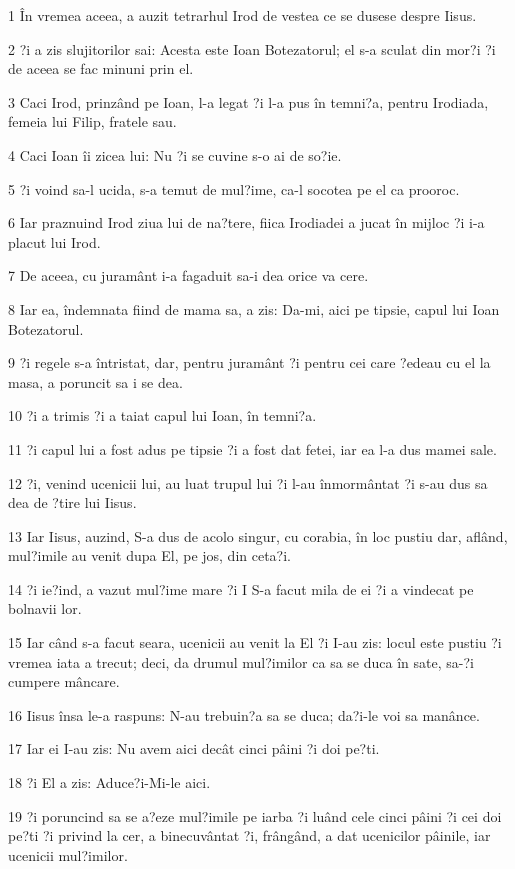 \par 1 În vremea aceea, a auzit tetrarhul Irod de vestea ce se dusese despre Iisus.
\par 2 ?i a zis slujitorilor sai: Acesta este Ioan Botezatorul; el s-a sculat din mor?i ?i de aceea se fac minuni prin el.
\par 3 Caci Irod, prinzând pe Ioan, l-a legat ?i l-a pus în temni?a, pentru Irodiada, femeia lui Filip, fratele sau.
\par 4 Caci Ioan îi zicea lui: Nu ?i se cuvine s-o ai de so?ie.
\par 5 ?i voind sa-l ucida, s-a temut de mul?ime, ca-l socotea pe el ca prooroc.
\par 6 Iar praznuind Irod ziua lui de na?tere, fiica Irodiadei a jucat în mijloc ?i i-a placut lui Irod.
\par 7 De aceea, cu juramânt i-a fagaduit sa-i dea orice va cere.
\par 8 Iar ea, îndemnata fiind de mama sa, a zis: Da-mi, aici pe tipsie, capul lui Ioan Botezatorul.
\par 9 ?i regele s-a întristat, dar, pentru juramânt ?i pentru cei care ?edeau cu el la masa, a poruncit sa i se dea.
\par 10 ?i a trimis ?i a taiat capul lui Ioan, în temni?a.
\par 11 ?i capul lui a fost adus pe tipsie ?i a fost dat fetei, iar ea l-a dus mamei sale.
\par 12 ?i, venind ucenicii lui, au luat trupul lui ?i l-au înmormântat ?i s-au dus sa dea de ?tire lui Iisus.
\par 13 Iar Iisus, auzind, S-a dus de acolo singur, cu corabia, în loc pustiu dar, aflând, mul?imile au venit dupa El, pe jos, din ceta?i.
\par 14 ?i ie?ind, a vazut mul?ime mare ?i I S-a facut mila de ei ?i a vindecat pe bolnavii lor.
\par 15 Iar când s-a facut seara, ucenicii au venit la El ?i I-au zis: locul este pustiu ?i vremea iata a trecut; deci, da drumul mul?imilor ca sa se duca în sate, sa-?i cumpere mâncare.
\par 16 Iisus însa le-a raspuns: N-au trebuin?a sa se duca; da?i-le voi sa manânce.
\par 17 Iar ei I-au zis: Nu avem aici decât cinci pâini ?i doi pe?ti.
\par 18 ?i El a zis: Aduce?i-Mi-le aici.
\par 19 ?i poruncind sa se a?eze mul?imile pe iarba ?i luând cele cinci pâini ?i cei doi pe?ti ?i privind la cer, a binecuvântat ?i, frângând, a dat ucenicilor pâinile, iar ucenicii mul?imilor.
